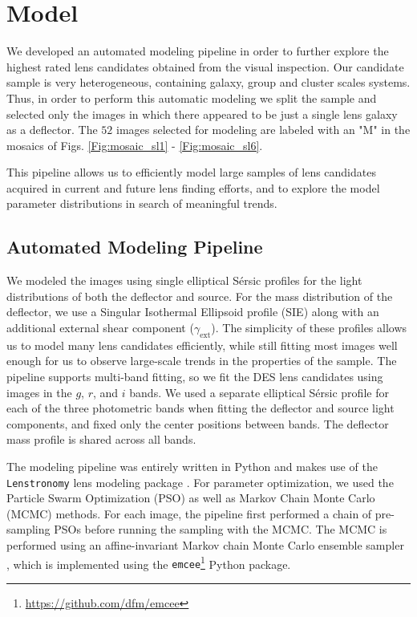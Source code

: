 \documentclass[tradiabstract,twocolumn]{aa}
\begin{document}
\section{Model}\label{sec:model}

We developed an automated modeling pipeline in order to further explore the highest rated lens candidates obtained from the visual inspection. Our candidate sample is very heterogeneous, containing galaxy, group and cluster scales systems. Thus, in order to perform this automatic modeling we split the sample and selected only the images in which there appeared to be just a single lens galaxy as a deflector. The $52$ images selected for modeling are labeled with an "M" in the mosaics of Figs. \ref{Fig:mosaic_sl1} - \ref{Fig:mosaic_sl6}. 

This pipeline allows us to efficiently model large samples of lens candidates acquired in current and future lens finding efforts, and to explore the model parameter distributions in search of meaningful trends. 

\subsection{Automated Modeling Pipeline}

We modeled the images using single elliptical S\'ersic profiles for the light distributions of both the deflector and source. For the mass distribution of the deflector, we use a Singular Isothermal Ellipsoid profile (SIE) along with an additional external shear component ($\gamma_{\text{ext}}$). The simplicity of these profiles allows us to model many lens candidates efficiently, while still fitting most images well enough for us to observe large-scale trends in the properties of the sample. The pipeline supports multi-band fitting, so we fit the DES lens candidates using images in the $g$, $r$, and $i$ bands. We used a separate elliptical S\'ersic profile for each of the three photometric bands when fitting the deflector and source light components, and fixed only the center positions between bands. The deflector mass profile is shared across all bands. %

The modeling pipeline was entirely written in Python and makes use of the {\tt Lenstronomy} lens modeling package \citep{Birrer2015,Birrer2018}. For parameter optimization, we used the Particle Swarm Optimization (PSO) \citep{Kennedy1995} as well as Markov Chain Monte Carlo (MCMC) methods. For each image, the pipeline first performed a chain of pre-sampling PSOs before running the sampling with the MCMC. The MCMC is performed using an affine-invariant Markov chain Monte Carlo ensemble sampler \citep{Goodman2010,emcee}, which is implemented using the {\tt emcee}\footnote{\url{https://github.com/dfm/emcee}} Python package. 
\end{document}
